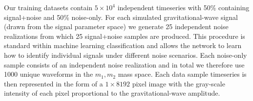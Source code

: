\documentclass[%
showpacs,
 amsmath,amssymb,
 aps,
 twocolumn,
 prl,
 reprint,
floatfix,
]{revtex4-1}
\begin{document}
%
%
Our training datasets contain $5\times 10^{4}$ independent timeseries with 50\%
containing signal+noise and 50\% noise-only. For each simulated
gravitational-wave signal (drawn from the signal parameter space) we generate
25 independent noise realizations from which 25 signal+noise samples are
produced. This procedure is standard within machine learning classification and
allows the network to learn how to identify individual signals under different
noise scenarios. Each noise-only sample consists of an independent noise
realization and in total we therefore use 1000 unique waveforms in the
$m_{1},m_{2}$ mass space. Each data sample timeseries is then represented in
the form of a $1 \times 8192$ pixel image with the gray-scale intensity of each
pixel proportional to the gravitational-wave amplitude.

%
%
\end{document}

